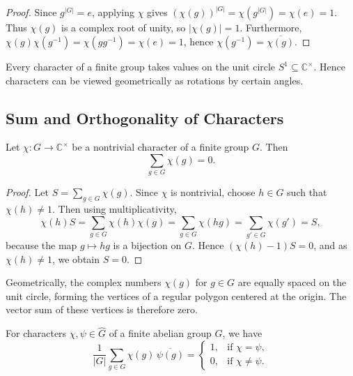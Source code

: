 \begin{proof}
Since $g^{|G|}=e$, applying $\chi$ gives $(\chi(g))^{|G|}=\chi(g^{|G|})=\chi(e)=1$.  
Thus $\chi(g)$ is a complex root of unity, so $|\chi(g)|=1$.  
Furthermore, $\chi(g)\chi(g^{-1})=\chi(gg^{-1})=\chi(e)=1$, hence $\chi(g^{-1})=\overline{\chi(g)}$.
\end{proof}

\begin{remark}
Every character of a finite group takes values on the unit circle $S^1\subseteq\mathbb{C}^\times$.  
Hence characters can be viewed geometrically as rotations by certain angles.
\end{remark}

\subsection{Sum and Orthogonality of Characters}

\begin{theorem}\label{thm:sum_zero}
Let $\chi:G\to\mathbb{C}^\times$ be a nontrivial character of a finite group $G$.  
Then
\[
\sum_{g\in G}\chi(g)=0.
\]
\end{theorem}

\begin{proof}
Let $S=\sum_{g\in G}\chi(g)$.  
Since $\chi$ is nontrivial, choose $h\in G$ such that $\chi(h)\ne1$.  
Then using multiplicativity,
\[
\chi(h)S = \sum_{g\in G}\chi(h)\chi(g)
= \sum_{g\in G}\chi(hg)
= \sum_{g'\in G}\chi(g')=S,
\]
because the map $g\mapsto hg$ is a bijection on $G$.  
Hence $(\chi(h)-1)S=0$, and as $\chi(h)\ne1$, we obtain $S=0$.
\end{proof}

\begin{remark}
Geometrically, the complex numbers $\chi(g)$ for $g\in G$ are equally spaced on the unit circle, forming the vertices of a regular polygon centered at the origin.  
The vector sum of these vertices is therefore zero.
\end{remark}

\begin{theorem}\label{thm:orthogonality}
For characters $\chi,\psi\in\widehat{G}$ of a finite abelian group $G$, we have
\[
\frac{1}{|G|}\sum_{g\in G}\chi(g)\,\overline{\psi(g)}=
\begin{cases}
1, & \text{if } \chi=\psi,\\[4pt]
0, & \text{if } \chi\ne\psi.
\end{cases}
\]
\end{theorem}

